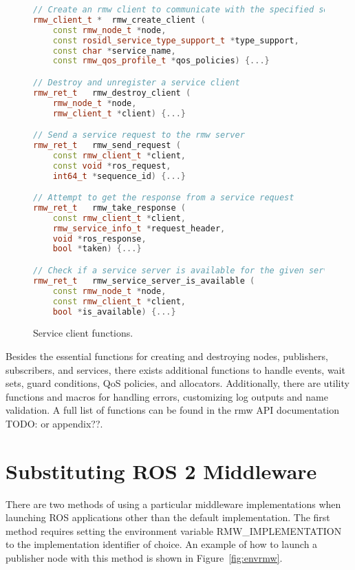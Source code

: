         \begin{figure}[htbp]
            \begin{lstlisting}[language=C++]
// Create an rmw client to communicate with the specified service
rmw_client_t * 	rmw_create_client (
    const rmw_node_t *node, 
    const rosidl_service_type_support_t *type_support, 
    const char *service_name, 
    const rmw_qos_profile_t *qos_policies) {...}

// Destroy and unregister a service client
rmw_ret_t 	rmw_destroy_client (
    rmw_node_t *node, 
    rmw_client_t *client) {...}

// Send a service request to the rmw server
rmw_ret_t 	rmw_send_request (
    const rmw_client_t *client, 
    const void *ros_request, 
    int64_t *sequence_id) {...}

// Attempt to get the response from a service request
rmw_ret_t 	rmw_take_response (
    const rmw_client_t *client, 
    rmw_service_info_t *request_header, 
    void *ros_response, 
    bool *taken) {...}

// Check if a service server is available for the given service client
rmw_ret_t 	rmw_service_server_is_available (
    const rmw_node_t *node, 
    const rmw_client_t *client, 
    bool *is_available) {...}
\end{lstlisting}
            \caption{Service client functions.}
            \label{fig:funclient}
        \end{figure}


    \pagebreak
    Besides the essential functions for creating and destroying nodes, publishers, subscribers, and services, there exists additional functions to handle events, wait sets, guard conditions, \ac{QoS} policies, and allocators. Additionally, there are utility functions and macros for handling errors, customizing log outputs and name validation. A full list of functions can be found in the \textsf{rmw} \ac{API} documentation~\cite{rmwapi} TODO: or appendix??.

\pagebreak
\section{Substituting ROS 2 Middleware}

    There are two methods of using a particular middleware implementations when launching \ac{ROS} applications other than the default implementation. The first method requires setting the environment variable \small\textsf{RMW\_IMPLEMENTATION} to the implementation identifier of choice. An example of how to launch a publisher node with this method is shown in Figure~\ref{fig:envrmw}.

